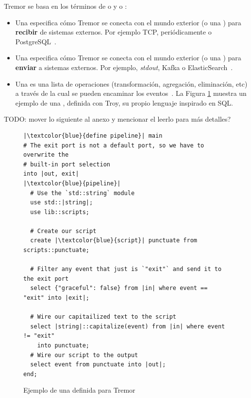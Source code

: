 Tremor se basa en los términos de \onramps o \sources y \offramps o \sinks:

\begin{itemize}
    \item Una \onramp especifica cómo Tremor se conecta con el mundo exterior (o
        una \pipeline) para \textbf{recibir} de sistemas externos. Por ejemplo
        TCP, periódicamente o PostgreSQL~\cite{tremoronramps}.

    \item Una \offramp especifica cómo Tremor se conecta con el mundo exterior
        (o una \pipeline) para \textbf{enviar} a sistemas externos. Por ejemplo,
        \emph{stdout}, Kafka o ElasticSearch~\cite{tremorofframps}.

    \item Una \pipeline es una lista de operaciones (transformación, agregación,
        eliminación, etc) a través de la cual se pueden encaminar los
        eventos~\cite{tremorpipelines}. La Figura \ref{fig:tremor_pipeline}
        muestra un ejemplo de una \pipeline, definida con Troy, su propio
        lenguaje inspirado en SQL.

\end{itemize}

TODO: mover lo siguiente al anexo y mencionar el leerlo para más detalles?

\begin{figure}
    \centering
    \begin{verbatim}
|\textcolor{blue}{define pipeline}| main
# The exit port is not a default port, so we have to overwrite the
# built-in port selection
into |out, exit|
|\textcolor{blue}{pipeline}|
  # Use the `std::string` module
  use std::|string|;
  use lib::scripts;

  # Create our script
  create |\textcolor{blue}{script}| punctuate from scripts::punctuate;

  # Filter any event that just is `"exit"` and send it to the exit port
  select {"graceful": false} from |in| where event == "exit" into |exit|;

  # Wire our capitailized text to the script
  select |string|::capitalize(event) from |in| where event != "exit"
    into punctuate;
  # Wire our script to the output
  select event from punctuate into |out|;
end;
    \end{verbatim}
    \caption{Ejemplo de una \pipeline definida para Tremor}%
    \label{fig:tremor_pipeline}
\end{figure}

